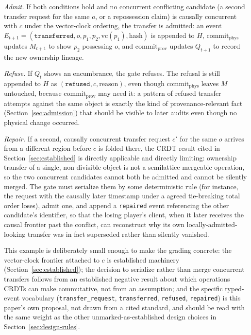 \documentclass[11pt]{article}
\begin{document}
\emph{Admit.} If both conditions hold and no concurrent conflicting candidate (a second transfer request for the same $o$, or a repossession claim) is causally concurrent with $c$ under the vector-clock ordering, the transfer is admitted: an event $E_{t+1} = (\texttt{transferred}, o, p_1, p_2, \mathrm{vc}(p_1), \mathrm{hash})$ is appended to $H$, $\mathrm{commit}_{\mathrm{phys}}$ updates $M_{t+1}$ to show $p_2$ possessing $o$, and $\mathrm{commit}_{\mathrm{prov}}$ updates $Q_{t+1}$ to record the new ownership lineage.

\emph{Refuse.} If $Q_t$ shows an encumbrance, the gate refuses. The refusal is still appended to $H$ as $(\texttt{refused}, c, \text{reason})$, even though $\mathrm{commit}_{\mathrm{phys}}$ leaves $M$ untouched, because $\mathrm{commit}_{\mathrm{prov}}$ may need it: a pattern of refused transfer attempts against the same object is exactly the kind of provenance-relevant fact (Section~\ref{sec:admission}) that should be visible to later audits even though no physical change occurred.

\emph{Repair.} If a second, causally concurrent transfer request $c'$ for the same $o$ arrives from a different region before $c$ is folded there, the CRDT result cited in Section~\ref{sec:established} is directly applicable and directly limiting: ownership transfer of a single, non-divisible object is not a semilattice-mergeable operation, so the two concurrent candidates cannot both be admitted and cannot be silently merged. The gate must serialize them by some deterministic rule (for instance, the request with the causally later timestamp under a agreed tie-breaking total order loses), admit one, and append a \texttt{repaired} event referencing the other candidate's identifier, so that the losing player's client, when it later receives the causal frontier past the conflict, can reconstruct why its own locally-admitted-looking transfer was in fact superseded rather than silently vanished.

This example is deliberately small enough to make the grading concrete: the vector-clock frontier attached to $c$ is established machinery (Section~\ref{sec:established}); the decision to serialize rather than merge concurrent transfers follows from an established negative result about which operations CRDTs can make commutative, not from an assumption; and the specific typed-event vocabulary (\texttt{transfer\_request}, \texttt{transferred}, \texttt{refused}, \texttt{repaired}) is this paper's own proposal, not drawn from a cited standard, and should be read with the same weight as the other unmarked-as-established design choices in Section~\ref{sec:design-rules}.
\end{document}
